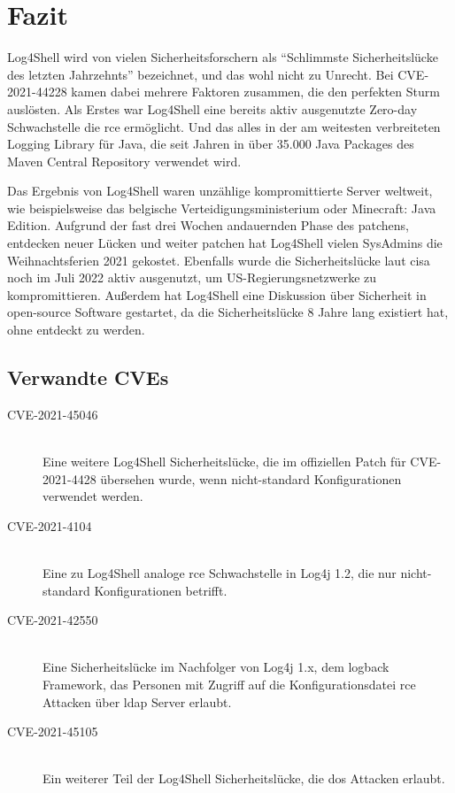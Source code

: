 
\section{Fazit}\label{sec:fazit}
Log4Shell wird von vielen Sicherheitsforschern als ``Schlimmste Sicherheitslücke des letzten Jahrzehnts'' bezeichnet, und das wohl nicht zu Unrecht.
Bei CVE-2021-44228 kamen dabei mehrere Faktoren zusammen, die den perfekten Sturm auslösten.
Als Erstes war Log4Shell eine bereits aktiv ausgenutzte Zero-day Schwachstelle die \gls{rce} ermöglicht.
Und das alles in der am weitesten verbreiteten Logging Library für Java, die seit Jahren in über 35.000 Java Packages des Maven Central Repository verwendet wird.

Das Ergebnis von Log4Shell waren unzählige kompromittierte Server weltweit, wie beispielsweise das belgische Verteidigungsministerium oder Minecraft: Java Edition.
Aufgrund der fast drei Wochen andauernden Phase des patchens, entdecken neuer Lücken und weiter patchen hat Log4Shell vielen SysAdmins die Weihnachtsferien 2021 gekostet.
Ebenfalls wurde die Sicherheitslücke laut \gls{cisa} noch im Juli 2022 aktiv ausgenutzt, um US-Regierungsnetzwerke zu kompromittieren.
Außerdem hat Log4Shell eine Diskussion über Sicherheit in open-source Software gestartet, da die Sicherheitslücke 8 Jahre lang existiert hat, ohne entdeckt zu werden.

\subsection{Verwandte CVEs}\label{subsec:weiteres}
\begin{description}
    \item[CVE-2021-45046]\hfill \\Eine weitere Log4Shell Sicherheitslücke, die im offiziellen Patch für CVE-2021-4428 übersehen wurde, wenn nicht-standard Konfigurationen verwendet werden.
    \item[CVE-2021-4104]\hfill \\Eine zu Log4Shell analoge \gls{rce} Schwachstelle in Log4j 1.2, die nur nicht-standard Konfigurationen betrifft.
    \item[CVE-2021-42550]\hfill \\Eine Sicherheitslücke im Nachfolger von Log4j 1.x, dem logback Framework, das Personen mit Zugriff auf die Konfigurationsdatei \gls{rce} Attacken über \gls{ldap} Server erlaubt.
    \item[CVE-2021-45105]\hfill \\Ein weiterer Teil der Log4Shell Sicherheitslücke, die \gls{dos} Attacken erlaubt.
\end{description}
